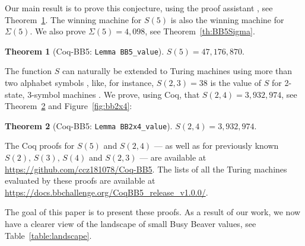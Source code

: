 \documentclass[a4paper,british]{article}
\theoremstyle{definition} %
\newtheorem{theorem}{Theorem}[section]
\numberwithin{equation}{section}
\theoremstyle{definition} %
\newcommand{\BBtheFifth}{47{,}176{,}870}
\newcommand{\SigmaTheFifth}{4{,}098}
\newcommand{\BBTxF}{3{,}932{,}974}
\newcommand{\CoqBB}{Coq-BB5\xspace}
\begin{document}
Our main result is to prove this conjecture, using the \Coq proof assistant \cite{the_coq_development_team_2024_14542673}, see Theorem~\ref{th:BB5}. The winning machine for $S(5)$ is also the winning machine for $\Sigma(5)$. We also prove $\Sigma(5) = \SigmaTheFifth$, see Theorem~\ref{th:BB5Sigma}.

\begin{theorem}[\CoqBB: \texttt{Lemma BB5\_value}]\label{th:BB5}
    $S(5) = \BBtheFifth$.
\end{theorem}

The function $S$ can naturally be extended to Turing machines using more than two alphabet symbols \cite{BradyMeaningOfLife}, like, for instance, $S(2,3) = 38$ is the value of $S$ for 2-state, 3-symbol machines \cite{BradyMeaningOfLife, MICHEL200445, LafittePapazian2007}. We prove, using Coq, that $S(2,4) = \BBTxF$, see Theorem~\ref{th:BB2x4} and Figure~\ref{fig:bb2x4}:

\begin{theorem}[\CoqBB: \texttt{Lemma BB2x4\_value}]\label{th:BB2x4}
    $S(2,4) = \BBTxF$.
\end{theorem}

The Coq proofs for $S(5)$ and $S(2,4)$ --- as well as for previously known $S(2),\,S(3),\,S(4)$ and $S(2,3)$ --- are available at \url{https://github.com/ccz181078/Coq-BB5}. The lists of all the Turing machines evaluated by these proofs are available at \url{https://docs.bbchallenge.org/CoqBB5_release_v1.0.0/}.

The goal of this paper is to present these proofs. As a result of our work, we now have a clearer view of the landscape of small Busy Beaver values, see Table~\ref{table:landscape}.
\end{document}
